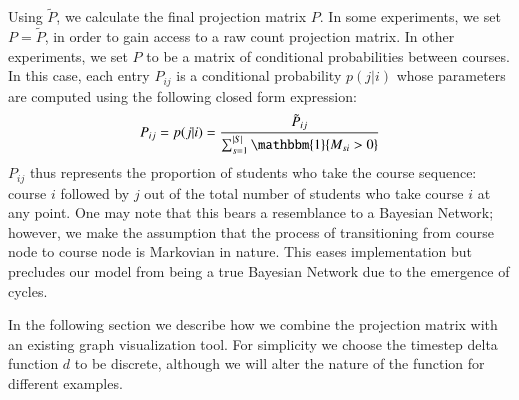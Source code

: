 Using $\tilde{P}$, we calculate the final projection matrix $P$. In some experiments, we set $P = \tilde{P}$, in order to gain access to a raw count projection matrix. In other experiments, we set $P$ to be a matrix of conditional probabilities between courses. In this case, each entry $P_{ij}$ is a conditional probability $p(j|i)$ whose parameters are computed using the following closed form expression:
\begin{equation}
    P_{ij} = p(j|i) = \frac{\tilde{P}_{ij}}{\sum_{s=1}^{|S|}\mathbbm{1}\{M_{si} > 0\}}
\end{equation}
$P_{ij}$ thus represents the proportion of students who take the
course sequence: course $i$ followed by $j$ out of the total number of
students who take course $i$ at any point. One may note that this
bears a resemblance to a Bayesian Network; however, we make the
assumption that the process of transitioning from course node to
course node is Markovian in nature. This eases implementation but
precludes our model from being a true Bayesian Network due to the
emergence of cycles.

In the following section we describe how we combine the projection
matrix with an existing graph visualization tool. For simplicity we
choose the timestep delta function $d$ to be discrete, although we
will alter the nature of the function for different examples.


